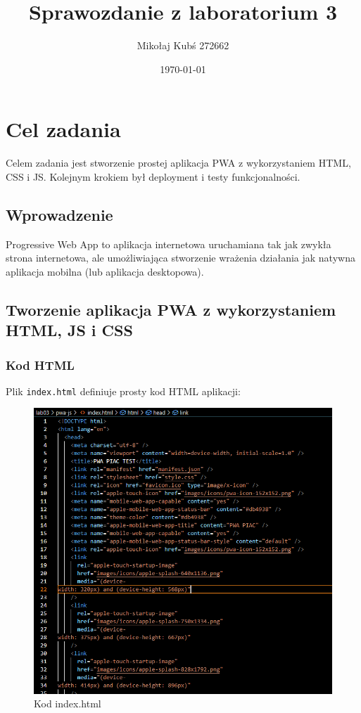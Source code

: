 \documentclass[a4paper,12pt]{article}
\title{Sprawozdanie z laboratorium 3}
\author{Mikołaj Kubś 272662}
\date{\today}
\begin{document}
\maketitle

\section{Cel zadania}

Celem zadania jest stworzenie prostej aplikacja PWA z wykorzystaniem HTML, CSS i JS. Kolejnym krokiem był deployment i testy funkcjonalności.

\subsection{Wprowadzenie}

Progressive Web App to aplikacja internetowa uruchamiana tak jak zwykła strona internetowa, ale
umożliwiająca stworzenie wrażenia działania jak natywna aplikacja mobilna (lub aplikacja
desktopowa).

\subsection{Tworzenie aplikacja PWA z wykorzystaniem HTML, JS i CSS}

\subsubsection{Kod HTML}
Plik \texttt{index.html} definiuje prosty kod HTML aplikacji:

\begin{figure}[H]
    \centering
    \includegraphics[width=1\textwidth]{images/index_html.png}
    \caption{Kod index.html}
\end{figure}
\end{document}
